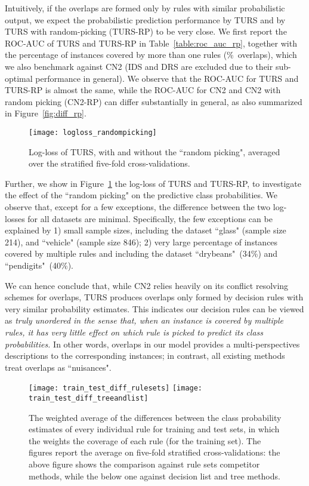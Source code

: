 Intuitively, if the overlaps are formed only by rules with similar probabilistic output, we expect the probabilistic prediction performance by TURS and by TURS with random-picking (TURS-RP) to be very close. We first report the ROC-AUC of TURS and TURS-RP in Table~\ref{table:roc_auc_rp}, together with the percentage of instances covered by more than one rules (\%~overlaps), which we also benchmark against CN2 (IDS and DRS are excluded due to their sub-optimal performance in general). We observe that the ROC-AUC for TURS and TURS-RP is almost the same, while the ROC-AUC for CN2 and CN2 with random picking (CN2-RP) can differ substantially in general, as also summarized in Figure~\ref{fig:diff_rp}.
\begin{figure}[ht] \centering 
	\texttt{[image: logloss\_randompicking]}
	\caption{Log-loss of TURS, with and without the ``random picking", averaged over the stratified five-fold cross-validations. } \label{fig:logloss_rp}
\end{figure}

Further, we show in Figure~\ref{fig:logloss_rp} the log-loss of TURS and TURS-RP, to investigate the effect of the ``random picking" on the predictive class probabilities. We observe that, except for a few exceptions, the difference between the two log-losses for all datasets are minimal. Specifically, the few exceptions can be explained by 1) small sample sizes, including the dataset ``glass" (sample size 214), and ``vehicle" (sample size 846); 2) very large percentage of instances covered by multiple rules and including the dataset ``drybeans"~(34\%) and ``pendigits"~(40\%). 

We can hence conclude that, while CN2 relies heavily on its conflict resolving schemes for overlaps, TURS produces overlaps only formed by decision rules with very similar probability estimates. This indicates our decision rules can be viewed as \emph{truly unordered in the sense that, when an instance is covered by multiple rules, it has very little effect on which rule is picked to predict its class probabilities.} In other words, overlaps in our model provides a multi-perspectives descriptions to the corresponding instances; in contrast, all existing methods treat overlaps as ``nuisances". 

\begin{figure}[ht]\centering
\texttt{[image: train\_test\_diff\_rulesets]}
\texttt{[image: train\_test\_diff\_treeandlist]}
\caption{The weighted average of the differences between the class probability estimates of every individual rule for training and test sets, in which the weights the coverage of each rule (for the training set). The figures report the average on five-fold stratified cross-validations: the above figure shows the comparison against rule sets competitor methods, while the below one against decision list and tree methods.}
\label{fig:train_test_diff}
\end{figure}
